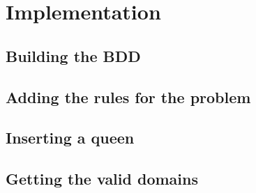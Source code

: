 \section{Implementation}
\label{Implementation}


\subsection{Building the BDD}

\subsection{Adding the rules for the problem}

\subsection{Inserting a queen}

\subsection{Getting the valid domains}